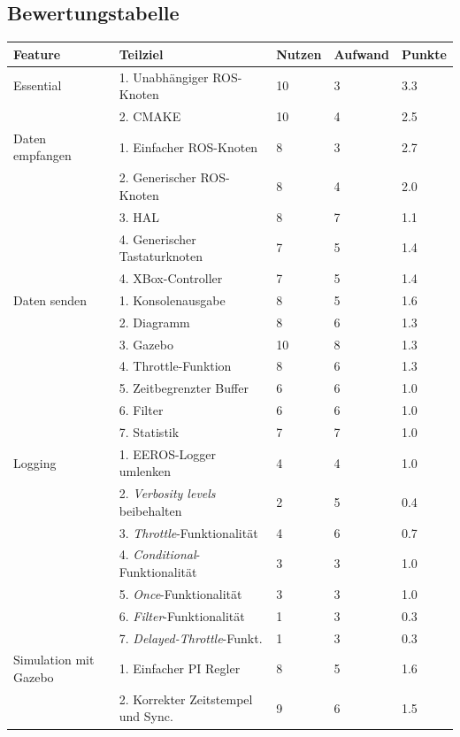 \subsection{Bewertungstabelle}
\label{Bewertungstabelle}
\begin{tabular}
  { l								| l			 								l			 l			 l }
  \textbf{Feature}					& \textbf{Teilziel}	& \textbf{Nutzen}	& \textbf{Aufwand}	& \textbf{Punkte}	\\ \hline
  
  Essential							& 1. Unabhängiger ROS-Knoten				& 10		& 3			& 3.3		\\
  									& 2. CMAKE									& 10		& 4			& 2.5		\\ \hline
  Daten empfangen					& 1. Einfacher ROS-Knoten					& 8			& 3			& 2.7		\\
  									& 2. Generischer ROS-Knoten					& 8			& 4			& 2.0		\\
  									& 3. HAL									& 8			& 7			& 1.1		\\
  									& 4. Generischer Tastaturknoten				& 7			& 5			& 1.4		\\ 
  									& 4. XBox-Controller						& 7			& 5			& 1.4		\\ \hline
  Daten senden						& 1. Konsolenausgabe 						& 8			& 5			& 1.6		\\
  									& 2. Diagramm								& 8			& 6			& 1.3		\\
  									& 3. Gazebo									& 10		& 8			& 1.3		\\
  									& 4. Throttle-Funktion						& 8			& 6			& 1.3		\\
  									& 5. Zeitbegrenzter Buffer					& 6			& 6			& 1.0		\\
  									& 6. Filter									& 6			& 6			& 1.0		\\
  									& 7. Statistik								& 7			& 7			& 1.0		\\ \hline
  Logging 							& 1. EEROS-Logger umlenken					& 4			& 4			& 1.0		\\
  									& 2. \textit{Verbosity levels} beibehalten	& 2			& 5			& 0.4		\\
  									& 3. \textit{Throttle}-Funktionalität		& 4			& 6			& 0.7		\\
  									& 4. \textit{Conditional}-Funktionalität 	& 3			& 3			& 1.0		\\
  									& 5. \textit{Once}-Funktionalität			& 3			& 3			& 1.0		\\
  									& 6. \textit{Filter}-Funktionalität			& 1			& 3			& 0.3		\\
  									& 7. \textit{Delayed-Throttle}-Funkt.		& 1			& 3			& 0.3		\\ \hline
  Simulation mit Gazebo				& 1. Einfacher PI Regler					& 8			& 5			& 1.6		\\
  									& 2. Korrekter Zeitstempel und Sync.		& 9			& 6			& 1.5		\\ \hline
\end{tabular}

